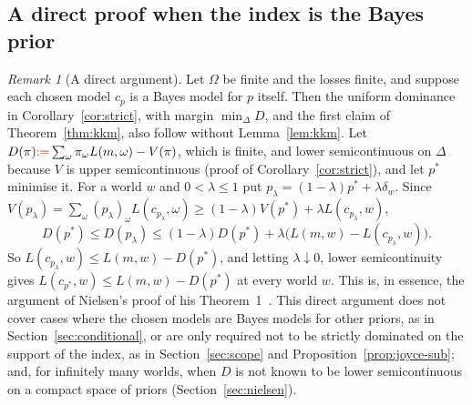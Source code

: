 \documentclass[11pt]{article}
\theoremstyle{definition}
\theoremstyle{remark}
\newtheorem{remark}[theorem]{Remark}
\begin{document}
\subsection{A direct proof when the index is the Bayes prior}\label{sec:direct}
\begin{remark}[A direct argument]\label{rem:direct}
Let $\Omega$ be finite and the losses finite, and suppose each chosen model $c_p$ is a Bayes model for $p$ itself. Then the uniform dominance in Corollary~\ref{cor:strict}, with margin $\min_\Delta D$, and the first claim of Theorem~\ref{thm:kkm}, also follow without Lemma~\ref{lem:kkm}. Let $D(\pi)\textcolor{red}{:=}\sum_\omega\pi_\omega L(m,\omega)-V(\pi)$, which is finite, and lower semicontinuous on $\Delta$ because $V$ is upper semicontinuous (proof of Corollary~\ref{cor:strict}), and let $p^*$ minimise it. For a world $w$ and $0<\lambda\le1$ put $p_\lambda=(1-\lambda)p^*+\lambda\delta_w$. Since $V(p_\lambda)=\sum_\omega(p_\lambda)_\omega L(c_{p_\lambda},\omega)\ge(1-\lambda)V(p^*)+\lambda L(c_{p_\lambda},w)$,
\[
 D(p^*)\le D(p_\lambda)\le(1-\lambda)D(p^*)+\lambda\bigl(L(m,w)-L(c_{p_\lambda},w)\bigr).
\]
So $L(c_{p_\lambda},w)\le L(m,w)-D(p^*)$, and letting $\lambda\downarrow0$, lower semicontinuity gives $L(c_{p^*},w)\le L(m,w)-D(p^*)$ at every world $w$. This is, in essence, the argument of Nielsen's proof of his Theorem~1~\cite[Appendix~C]{Nielsen}. This direct argument does not cover cases where the chosen models are Bayes models for other priors, as in Section~\ref{sec:conditional}, or are only required not to be strictly dominated on the support of the index, as in Section~\ref{sec:scope} and Proposition~\ref{prop:joyce-sub}; and, for infinitely many worlds, when $D$ is not known to be lower semicontinuous on a compact space of priors (Section~\ref{sec:nielsen}).
\end{remark}
\end{document}
